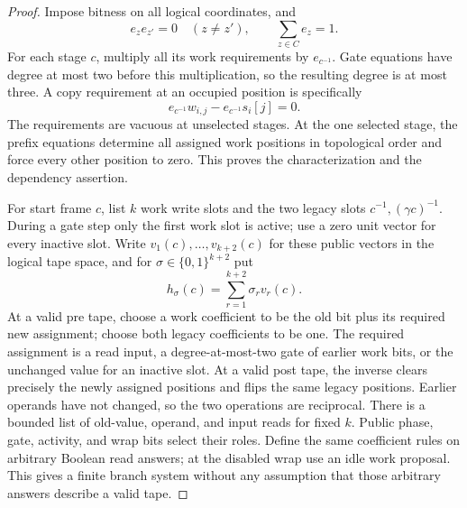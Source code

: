 \begin{proof}
Impose bitness on all logical coordinates, and
\begin{equation}
 e_z e_{z'}=0\quad(z\ne z'),\qquad
 \sum_{z\in C}e_z=1.                              \label{ia:one-hot}
\end{equation}
For each stage $c$, multiply all its work requirements by
$e_{c^{-1}}$.  Gate equations have degree at most two before this
multiplication, so the resulting degree is at most three.  A copy
requirement at an occupied position is specifically
\begin{equation}
 e_{c^{-1}}w_{i,j}-e_{c^{-1}}s_i[j]=0.             \label{ia:copy-equation}
\end{equation}
The requirements are vacuous at unselected stages.  At the one selected
stage, the prefix equations determine all assigned work positions in
topological order and force every other position to zero.  This proves
the characterization and the dependency assertion.

For start frame $c$, list $k$ work write slots and the two legacy slots
$c^{-1},(\gamma c)^{-1}$.  During a gate step only the first work slot
is active; use a zero unit vector for every inactive slot.  Write
$v_1(c),\ldots,v_{k+2}(c)$ for these public vectors in the logical tape
space, and for $\sigma\in\{0,1\}^{k+2}$ put
\begin{equation}
 h_\sigma(c)=\sum_{r=1}^{k+2}\sigma_r v_r(c).
                                                               \label{ia:flip-mask}
\end{equation}
At a valid pre tape, choose a work coefficient to be the old bit plus
its required new assignment; choose both legacy coefficients to be one.
The required assignment is a read input, a degree-at-most-two gate of
earlier work bits, or the unchanged value for an inactive slot.  At a
valid post tape, the inverse clears precisely the newly assigned
positions and flips the same legacy positions.  Earlier operands have
not changed, so the two operations are reciprocal.  There is a bounded
list of old-value, operand, and input reads for fixed $k$.  Public phase,
gate, activity, and wrap bits select their roles.  Define the same
coefficient rules on arbitrary Boolean read answers; at the disabled
wrap use an idle work proposal.  This gives a finite branch system
without any assumption that those arbitrary answers describe a valid
tape.
\end{proof}

